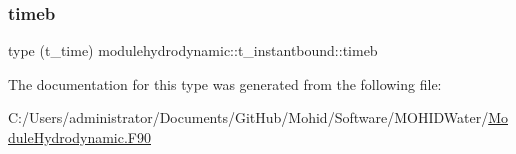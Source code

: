 \mbox{\label{structmodulehydrodynamic_1_1t__instantbound_a513e78c597b93d440e08977b19abd195}} 
\subsubsection{\texorpdfstring{timeb}{timeb}}
{\footnotesize\ttfamily type (t\+\_\+time) modulehydrodynamic\+::t\+\_\+instantbound\+::timeb\hspace{0.3cm}{\ttfamily [private]}}



The documentation for this type was generated from the following file\+:\begin{DoxyCompactItemize}
\item 
C\+:/\+Users/administrator/\+Documents/\+Git\+Hub/\+Mohid/\+Software/\+M\+O\+H\+I\+D\+Water/\mbox{\hyperlink{_module_hydrodynamic_8_f90}{Module\+Hydrodynamic.\+F90}}\end{DoxyCompactItemize}

